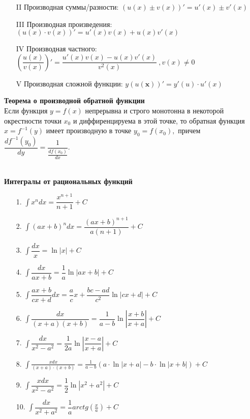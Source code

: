 \documentclass[12pt,4paper]{report}
\begin{document}
\begin{landscape}
\begin{itemize}
\item[II] Производная суммы/разности: $(u(x)\pm v(x))' = u'(x) \pm v'(x) $
\item[III] Производная произведения: $(u(x) \cdot v(x))' = u'(x)v(x) + u(x)v'(x)$
\item[IV]  Производная частного:$(\dfrac{u(x)}{v(x)})' = \dfrac{u'(x)v(x) - u(x)v'(x)}{v^2(x)} \ ,v(x) \neq 0 $
\item[V] Производная сложной функции: $y(u(\mathbf{x}))' = y'(u) \cdot u'(x)$ 
\end{itemize}
\newpage
{\Large \textbf {Теорема о производной обратной функции}}
\\
Если функция $y = f(x)$ непрерывна и строго монотонна в некоторой окрестности точки $x_{0}$ и диффиренцируема в этой точке, то обратная функция $x = f^{-1}(y)$ имеет производную в точке $y_{0} = f(x_{0}),$  причем $\dfrac{df^{-1}(y_{0})}{dy} = \dfrac{1}{\frac{df(x_{0})}{dx}}.$ 
\\
\\
\newpage
{\large \textbf{Интегралы от рациональных функций}}
    \begin{itemize}
\item[1.] $\int x^n dx = \dfrac{x^{n+1}}{n+1} + C  $
\item[2.] $\int (ax + b)^n dx = \dfrac{(ax + b)^{n+1}}{a(n+1)} + C  $
\item[3.] $\int \dfrac{dx}{x} = \ln|x| + C $
\item[4.] $\int \dfrac{dx}{ax+b} = \dfrac{1}{a} \ln |ax+b| + C $
\item[5.] $\int \dfrac{ax+b}{cx+d}dx = \dfrac{a}{c} x + \dfrac{bc-ad}{c^2} \ln |cx+d| + C $
\item[6.] $\int \dfrac{dx}{(x+a)(x+b)} = \dfrac{1}{a-b}\ln \left| \dfrac{x+b}{x+a} \right| + C\ $ 
\item[7.] $\int \dfrac{dx}{x^2 - a^2} = \dfrac{1}{2a}\ln \left| \dfrac{x-a}{x+a} \right| + C\ $ 
\item[8.] $\int \frac{xdx}{(x+a)\cdot(x+b)} = \frac{1}{a-b}(a \cdot \ln |x+a| - b \cdot \ln |x+b|) + C $
\item[9.] $\int\dfrac{xdx}{x^2 - a^2} = \dfrac{1}{2}\ln |x^2 + a^2| + C$
\item[10.] $\int\dfrac{dx}{x^2 + a^2} = \dfrac{1}{a}arctg\left( \frac{x}{a} \right)+C$

\end{itemize}
\end{landscape}
\end{document}
